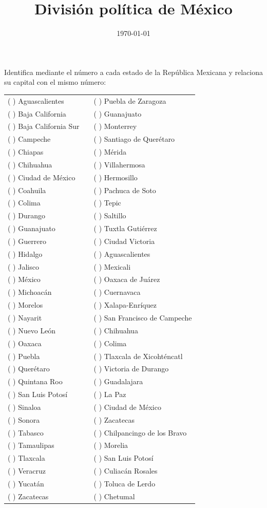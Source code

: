 
\title{\vspace*{-2cm}División política de México\vspace{-5ex}}
\date{\today}

\maketitle

Identifica mediante el número a cada estado de la República Mexicana y relaciona su capital con el mismo número:
\begin{table}[H]
\centering
\begin{tabular}{p{5cm} p{2cm} p{6cm}}
( ) Aguascalientes & & ( ) Puebla de Zaragoza \\
( ) Baja California & & ( ) Guanajuato \\
( ) Baja California Sur & & ( ) Monterrey \\
( ) Campeche & & ( ) Santiago de Querétaro \\
( ) Chiapas & & ( ) Mérida \\
( ) Chihuahua & & ( ) Villahermosa \\
( ) Ciudad de México &  & ( ) Hermosillo \\
( ) Coahuila & & ( ) Pachuca de Soto \\
( ) Colima & & ( ) Tepic \\
( ) Durango & & ( ) Saltillo \\
( ) Guanajuato & & ( ) Tuxtla Gutiérrez \\
( ) Guerrero & & ( ) Ciudad Victoria \\
( ) Hidalgo & & ( ) Aguascalientes \\
( ) Jalisco & & ( ) Mexicali \\
( ) México & & ( ) Oaxaca de Juárez \\
( ) Michoacán & & ( ) Cuernavaca \\
( ) Morelos & & ( ) Xalapa-Enríquez \\
( ) Nayarit & & ( ) San Francisco de Campeche \\
( ) Nuevo León & & ( ) Chihuahua \\
( ) Oaxaca & & ( ) Colima \\
( ) Puebla & & ( ) Tlaxcala de Xicohténcatl \\
( ) Querétaro & & ( ) Victoria de Durango \\
( ) Quintana Roo & & ( ) Guadalajara \\
( ) San Luis Potosí & & ( ) La Paz \\
( ) Sinaloa & & ( ) Ciudad de México \\
( ) Sonora & & ( ) Zacatecas \\
( ) Tabasco & & ( ) Chilpancingo de los Bravo \\
( ) Tamaulipas & & ( ) Morelia \\
( ) Tlaxcala & & ( ) San Luis Potosí \\
( ) Veracruz & & ( ) Culiacán Rosales \\
( ) Yucatán & & ( ) Toluca de Lerdo \\
( ) Zacatecas & & ( ) Chetumal \\
\end{tabular}
\end{table}


